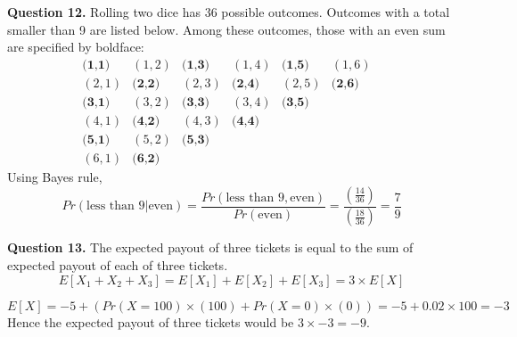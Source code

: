 \documentclass{ximera}
\begin{document}
\textbf{Question 12.} Rolling two dice has 36 possible outcomes. Outcomes with a total smaller than 9 are listed below. Among these outcomes, those with an even sum are specified by boldface:
\begin{equation*}
\begin{matrix}
\textbf{(1,1)} & (1,2) & \textbf{(1,3)} & (1,4) & \textbf{(1,5)} & (1,6) \\
(2,1) & \textbf{(2,2)} & (2,3) & \textbf{(2,4)} & (2,5) & \textbf{(2,6)} \\
\textbf{(3,1)} & (3,2) & \textbf{(3,3)} & (3,4) & \textbf{(3,5)} && \\
(4,1) & \textbf{(4,2)} & (4,3) & \textbf{(4,4)} &&& \\
\textbf{(5,1)} & (5,2) & \textbf{(5,3)} &&&& \\
(6,1) & \textbf{(6,2)}
\end{matrix}
\end{equation*}
Using Bayes rule,
\begin{equation*}
Pr (\text{less than 9} | \text{even}) = \frac{Pr(\text{less than 9}, \text{even})}{Pr(\text{even})} = \frac{(\frac{14}{36})}{(\frac{18}{36})} = \frac{7}{9}
\end{equation*}

\textbf{Question 13.} The expected payout of three tickets is equal to the sum of expected payout of each of three tickets. 
\begin{equation*}
E[X_1 + X_2 + X_3] = E[X_1] + E[X_2] + E[X_3] = 3 \times E[X]
\end{equation*}

\begin{equation*}
E[X] = -5 + \left(Pr(X = 100) \times (100) + Pr(X = 0) \times (0)\right) = -5 + 0.02 \times 100 = -3
\end{equation*}
Hence the expected payout of three tickets would be $3 \times -3 = -9$.
\end{document}
